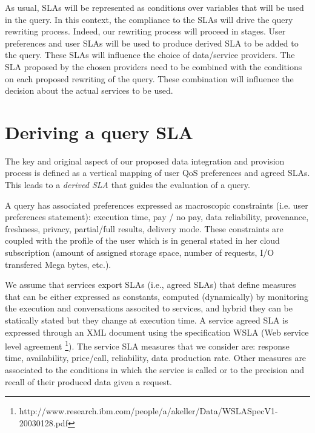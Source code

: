 As usual, SLAs will be represented as conditions over variables that will be used in the query.
In this context, the compliance to the SLAs will drive the query rewriting process.
Indeed, our rewriting process will proceed in stages.
User preferences and user SLAs will be used to produce derived SLA to be added to the query. 
These SLAs will influence the choice of data/service providers.
The SLA proposed by the chosen providers need to be combined with the conditions on each proposed rewriting of the query.
These combination will influence the decision about the actual services to be used.



\section{Deriving a query SLA}
\label{sec:slaModel}

The key and original aspect of   our proposed data integration and provision process is  defined as a vertical mapping of user QoS preferences and agreed SLAs. This  leads to a {\em derived SLA} that guides the evaluation of a query. 

A query has associated preferences  expressed as macroscopic constraints (i.e. user preferences statement): execution time, pay / no pay, data reliability, provenance, freshness, privacy, partial/full results, delivery mode. These constraints are coupled with the profile of the user which is in general stated in her cloud subscription (amount of assigned storage space, number of requests, I/O transfered Mega bytes, etc.). 

We assume that services export SLAs (i.e., agreed SLAs) that define measures   that can be either expressed as constants,  computed (dynamically) by monitoring the execution and conversations associted to services, and hybrid they can be statically stated  but they change at execution time.  A service  agreed SLA is expressed through an  XML document using the specification WSLA (Web service level agreement \footnote{\footnotesize http://www.research.ibm.com/people/a/akeller/\-Data/WSLASpecV1-20030128.pdf}). The service SLA measures  that we consider are: response time, availability, price/call, reliability, data production rate. Other measures are associated to the conditions in which the service is called or to the precision and recall of their produced data given a request. 

